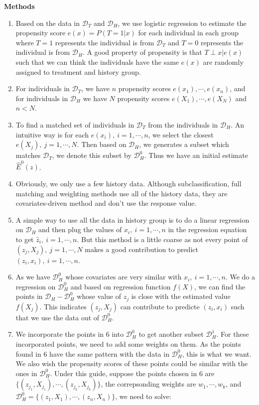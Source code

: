 \documentclass{article}
\begin{document}
\textbf{Methods}
\begin{enumerate}
\item Based on the data in $\mathscr{D}_{T}$ and $\mathscr{D}_{H}$, we use logistic regression to estimate the propensity score $e(x)=P(T=1|x)$ for each individual in each group where $T=1$ represents the individual is from $\mathscr{D}_{T}$ and $T=0$ represents the individual is from $\mathscr{D}_{H}$. A good property of propensity is that $T\perp x|e(x)$ such that we can think the individuals have the same $e(x)$ are randomly assigned to treatment and history group.
\item For individuals in $\mathscr{D}_{T}$, we have $n$ propensity scores $e(x_{1}), \cdots, e(x_{n})$, and for individuals in $\mathscr{D}_{H}$ we have $N$ propensity scores $e(X_{1}), \cdots, e(X_{N})$ and $n<N$.
\item To find a matched set of individuals in $\mathscr{D}_{T}$ from the individuals in $\mathscr{D}_{H}$. An intuitive way is for each $e(x_{i}),~i=1,\cdots, n$, we select the closest $e(X_{j}),~j=1, \cdots, N$. Then based on $\mathscr{D}_{H}$, we generates a subset which matches $\mathscr{D}_{T}$, we denote this subset by $\mathscr{D}^{0}_{H}$. Thus we have an initial estimate $\hat{E}^{0}(z)$.
\item Obviously, we only use a few history data. Although subclassification, full matching and weighting methods use all of the history data, they are covariates-driven method and don't use the response value. 
\item A simple way to use all the data in history group is to do a linear regression on $\mathscr{D}_{H}$ and then plug the values of $x_{i},~i=1,\cdots,n$ in the regression equation to get $\hat{z}_{i},~i=1,\cdots,n$. But this method is a little coarse as not every point of $(z_{j}, X_{j}),~j=1,\cdots, N$ makes a good contribution to predict $(z_{i}, x_{i}),~i=1,\cdots,n$.
\item As we have $\mathscr{D}^{0}_{H}$ whose covariates are very similar with $x_{i},~i=1,\cdots,n$. We do a regression on $\mathscr{D}^{0}_{H}$ and based on regression function $f(X)$, we can find the points in $\mathscr{D}_{H}-\mathscr{D}^{0}_{H}$ whose value of $z_{j}$ is close with the estimated value $f(X_{j})$. This indicates $(z_{j}, X_{j})$ can contribute to predicte $(z_{i}, x_{i})$ such that we use the data out of $\mathscr{D}^{0}_{H}$.
\item We incorporate the points in 6 into $\mathscr{D}^{0}_{H}$ to get another subset $\mathscr{D}^{1}_{H}$. For these incorporated points, we need to add some weights on them. As the points found in 6 have the same pattern with the data in $\mathscr{D}^{0}_{H}$, this is what we want. We also wish the propensity scores of these points could be similar with the ones in $\mathscr{D}^{0}_{H}$. Under this guide, suppose the points chosen in 6 are $\{(z_{j_{1}}, X_{j_{1}}),\cdots,(z_{j_{k}}, X_{j_{k}})\}$, the correpsonding weights are $w_{1}, \cdots, w_{k}$, and $\mathscr{D}^{0}_{H}=\{(z_{1}, X_{1}),\cdots,(z_{n}, X_{n})\}$, we need to solve:

\end{enumerate}
\end{document}
